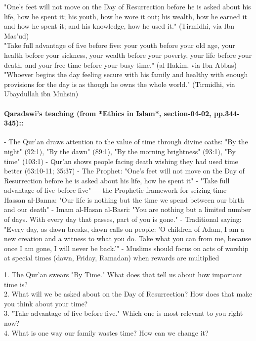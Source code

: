 \documentclass[11pt,a4paper]{article}
\begin{document}
\begin{hadithbox} "One's feet will not move on the Day of Resurrection before he is asked about his life, how he spent it; his youth, how he wore it out; his wealth, how he earned it and how he spent it; and his knowledge, how he used it." (Tirmidhi, via Ibn Mas'ud) \\ "Take full advantage of five before five: your youth before your old age, your health before your sickness, your wealth before your poverty, your life before your death, and your free time before your busy time." (al-Hakim, via Ibn Abbas) \\ "Whoever begins the day feeling secure with his family and healthy with enough provisions for the day is as though he owns the whole world." (Tirmidhi, via Ubaydullah ibn Muhsin) \end{hadithbox}

\paragraph*{Qaradawi's teaching (from *Ethics in Islam*, section-04-02, pp.344-345)::}  - The Qur'an draws attention to the value of time through divine oaths: "By the night" (92:1), "By the dawn" (89:1), "By the morning brightness" (93:1), "By time" (103:1) - Qur'an shows people facing death wishing they had used time better (63:10-11; 35:37) - The Prophet: "One's feet will not move on the Day of Resurrection before he is asked about his life, how he spent it" - "Take full advantage of five before five" --- the Prophetic framework for seizing time - Hassan al-Banna: "Our life is nothing but the time we spend between our birth and our death" - Imam al-Hasan al-Basri: "You are nothing but a limited number of days. With every day that passes, part of you is gone." - Traditional saying: "Every day, as dawn breaks, dawn calls on people: 'O children of Adam, I am a new creation and a witness to what you do. Take what you can from me, because once I am gone, I will never be back.'" - Muslims should focus on acts of worship at special times (dawn, Friday, Ramadan) when rewards are multiplied

\begin{discussionbox} 1. The Qur'an swears "By Time." What does that tell us about how important time is? \\ 2. What will we be asked about on the Day of Resurrection? How does that make you think about your time? \\ 3. "Take advantage of five before five." Which one is most relevant to you right now? \\ 4. What is one way our family wastes time? How can we change it? \end{discussionbox}
\end{document}
